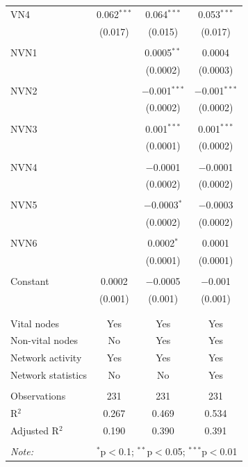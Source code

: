 \begin{table}[!htbp]
\begin{tabular}{@{\extracolsep{5pt}}lccc}
 VN4 & 0.062$^{***}$ & 0.064$^{***}$ & 0.053$^{***}$ \\ 
  & (0.017) & (0.015) & (0.017) \\ 
  & & & \\ 
 NVN1 &  & 0.0005$^{**}$ & 0.0004 \\ 
  &  & (0.0002) & (0.0003) \\ 
  & & & \\ 
 NVN2 &  & $-$0.001$^{***}$ & $-$0.001$^{***}$ \\ 
  &  & (0.0002) & (0.0002) \\ 
  & & & \\ 
 NVN3 &  & 0.001$^{***}$ & 0.001$^{***}$ \\ 
  &  & (0.0001) & (0.0002) \\ 
  & & & \\ 
 NVN4 &  & $-$0.0001 & $-$0.0001 \\ 
  &  & (0.0002) & (0.0002) \\ 
  & & & \\ 
 NVN5 &  & $-$0.0003$^{*}$ & $-$0.0003 \\ 
  &  & (0.0002) & (0.0002) \\ 
  & & & \\ 
 NVN6 &  & 0.0002$^{*}$ & 0.0001 \\ 
  &  & (0.0001) & (0.0001) \\ 
  & & & \\ 
 Constant & 0.0002 & $-$0.0005 & $-$0.001 \\ 
  & (0.001) & (0.001) & (0.001) \\ 
  & & & \\ 
\hline \\[-1.8ex] 
Vital nodes & Yes & Yes & Yes \\ 
Non-vital nodes & No & Yes & Yes \\ 
Network activity & Yes & Yes & Yes \\ 
Network statistics & No & No & Yes \\ 
\hline &  &  &  \\ 
Observations & 231 & 231 & 231 \\ 
R$^{2}$ & 0.267 & 0.469 & 0.534 \\ 
Adjusted R$^{2}$ & 0.190 & 0.390 & 0.391 \\ 
\hline 
\hline \\[-1.8ex] 
\textit{Note:}  & \multicolumn{3}{r}{$^{*}$p$<$0.1; $^{**}$p$<$0.05; $^{***}$p$<$0.01} \\ 
\end{tabular} 
\end{table} 

